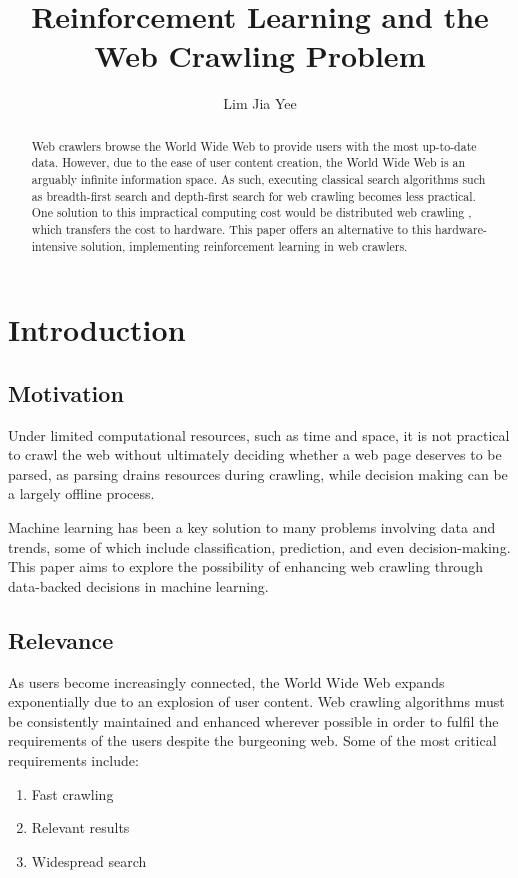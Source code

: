 \documentclass{article}
\title{Reinforcement Learning and the Web Crawling Problem}
\author{Lim Jia Yee}
\begin{document}
\maketitle
\newpage

\tableofcontents
\newpage

\begin{abstract}
Web crawlers browse the World Wide Web to provide users with the most up-to-date data. However, due to the ease of user content creation, the World Wide Web is an arguably infinite information space. As such, executing classical search algorithms such as breadth-first search and depth-first search for web crawling becomes less practical. One solution to this impractical computing cost would be distributed web crawling \cite{bib-01}, which transfers the cost to hardware. This paper offers an alternative to this hardware-intensive solution, implementing reinforcement learning in web crawlers.
\end{abstract}
\newpage

\section{Introduction}
\label{sec:1}
\begin{comment}
(Propose a problem in any area of computer science that you want to solve. Please articulate the motivation, relevance, and technical challenge of the problem.)
\end{comment}

\subsection{Motivation}
Under limited computational resources, such as time and space, it is not practical to crawl the web without ultimately deciding whether a web page deserves to be parsed, as parsing drains resources during crawling, while decision making can be a largely offline process.
\medskip

Machine learning has been a key solution to many problems involving data and trends, some of which include classification, prediction, and even decision-making. This paper aims to explore the possibility of enhancing web crawling through data-backed decisions in machine learning.

\subsection{Relevance}
As users become increasingly connected, the World Wide Web expands exponentially due to an explosion of user content. Web crawling algorithms must be consistently maintained and enhanced wherever possible in order to fulfil the requirements of the users despite the burgeoning web. Some of the most critical requirements include:
\begin{enumerate}
	\item Fast crawling
	\item Relevant results
	\item Widespread search
\end{enumerate}
\end{document}
